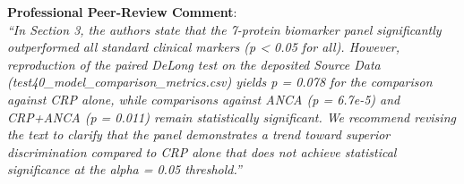 \documentclass[11pt,twoside,openright]{book}
\begin{document}
\noindent
\textbf{Professional Peer-Review Comment}:\\
\textit{``In Section 3, the authors state that the 7-protein biomarker panel significantly outperformed all standard clinical markers (p < 0.05 for all). However, reproduction of the paired DeLong test on the deposited Source Data (test40\_model\_comparison\_metrics.csv) yields p = 0.078 for the comparison against CRP alone, while comparisons against ANCA (p = 6.7e-5) and CRP+ANCA (p = 0.011) remain statistically significant. We recommend revising the text to clarify that the panel demonstrates a trend toward superior discrimination compared to CRP alone that does not achieve statistical significance at the alpha = 0.05 threshold.''}

\end{document}
